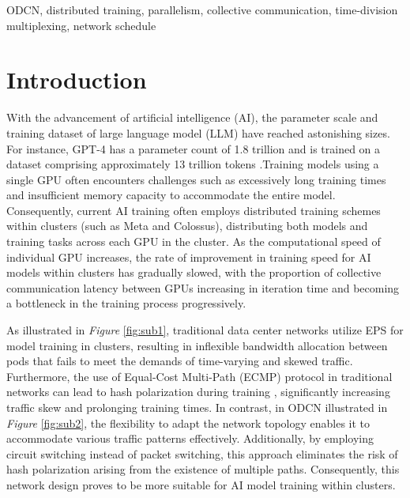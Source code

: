 \documentclass[conference]{IEEEtran}
\begin{document}
\begin{IEEEkeywords}
	ODCN, distributed training, parallelism, collective communication, time-division multiplexing, network schedule
\end{IEEEkeywords}

\section{Introduction}

With the advancement of artificial intelligence (AI), the parameter scale and training dataset of large language model (LLM) have reached astonishing sizes. For instance, GPT-4 has a parameter count of 1.8 trillion and is trained on a dataset comprising approximately 13 trillion tokens \cite{GPT4}.Training models using a single GPU often encounters challenges such as excessively long training times and insufficient memory capacity to accommodate the entire model. Consequently, current AI training often employs distributed training schemes \cite{surveyDML} within clusters (such as Meta \cite{Meta} and Colossus), distributing both models and training tasks across each GPU in the cluster. As the computational speed of individual GPU increases, the rate of improvement in training speed for AI models within clusters has gradually slowed, with the proportion of collective communication latency between GPUs increasing in iteration time and becoming a bottleneck in the training process progressively.

As illustrated in \emph{Figure} \ref{fig:sub1}, traditional data center networks utilize EPS for model training in clusters, resulting in inflexible bandwidth allocation between pods that fails to meet the demands of time-varying and skewed traffic. Furthermore, the use of Equal-Cost Multi-Path (ECMP) protocol in traditional networks can lead to hash polarization during training \cite{HPN}, significantly increasing traffic skew and prolonging training times. In contrast, in ODCN illustrated in \emph{Figure} \ref{fig:sub2}, the flexibility to adapt the network topology enables it to accommodate various traffic patterns effectively. Additionally, by employing circuit switching instead of packet switching, this approach eliminates the risk of hash polarization arising from the existence of multiple paths. Consequently, this network design proves to be more suitable for AI model training within clusters.
\end{document}
